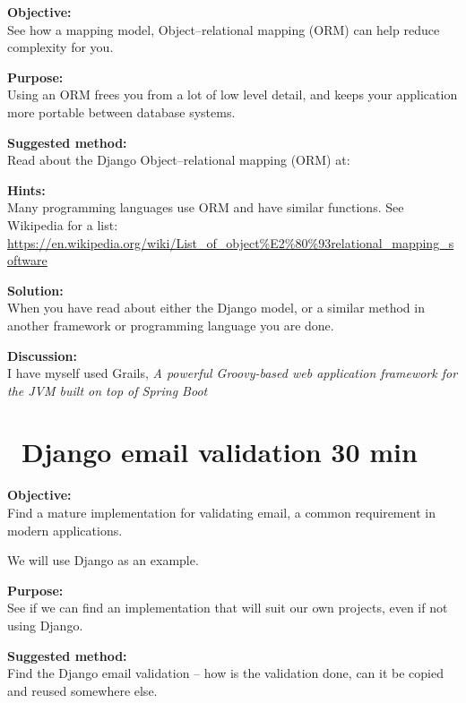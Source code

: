 \documentclass[a4paper,11pt,notitlepage]{report}
\begin{document}
{\bf Objective:}\\
See how a mapping model, Object--relational mapping (ORM) can help reduce complexity for you.


{\bf Purpose:}\\
Using an ORM frees you from a lot of low level detail, and keeps your application more portable between database systems.


{\bf Suggested method:}\\
Read about the Django  Object--relational mapping (ORM) at:

\begin{list2}
\item {}
\item {}
\end{list2}

{\bf Hints:}\\
Many programming languages use ORM and have similar functions. See Wikipedia for a list:\\
\url{https://en.wikipedia.org/wiki/List_of_object%E2%80%93relational_mapping_software}

{\bf Solution:}\\
When you have read about either the Django model, or a similar method in another framework or programming language you are done.

{\bf Discussion:}\\
I have myself used Grails,
\emph{A powerful Groovy-based web application framework for the JVM built on top of Spring Boot}



\chapter{\faExclamationTriangle\ Django email validation 30 min}
\label{ex:django-email}



{\bf Objective:}\\
Find a mature implementation for validating email, a common requirement in modern applications.

We will use Django as an example.

{\bf Purpose:}\\
See if we can find an implementation that will suit our own projects, even if not using Django.

{\bf Suggested method:}\\
Find the Django email validation -- how is the validation done, can it be copied and reused somewhere else.
\end{document}
